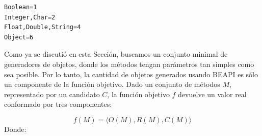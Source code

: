\begin{lstlisting}[label=fig:rankParameters,caption=Ranking con los tipos de parametros, captionpos=b,frame=tb, float=t]
Boolean=1
Integer,Char=2
Float,Double,String=4
Object=6
\end{lstlisting}

Como ya se discutió en esta Sección, buscamos un conjunto minimal de generadores de objetos, donde los métodos tengan parámetros tan simples como sea posible. Por lo tanto, la cantidad de objetos generados usando BEAPI es sólo un componente de la función objetivo. Dado un conjunto de métodos $M$, representado por un candidato $C$, la función objetivo $f$ devuelve un valor real conformado por tres componentes:

\[
f(M) = \langle O(M), R(M), C(M) \rangle
\]
Donde:

